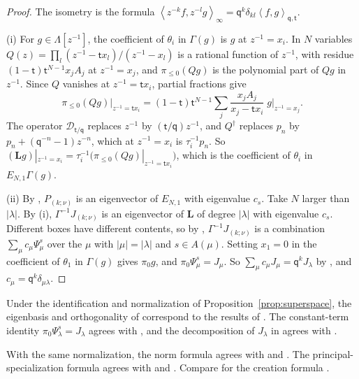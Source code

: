 \documentclass[11pt]{amsart}
\theoremstyle{definition}
\theoremstyle{remark}
\newcommand{\Mq}{\mathsf q}                      %
\newcommand{\Mt}{\mathsf t}                      %
\newcommand{\La}{\Lambda}                        %
\newcommand{\Add}[1]{A(#1)}                      %
\newcommand{\ip}[2]{\left\langle #1,#2\right\rangle}
\newcommand{\ipinf}[2]{\left\langle #1,#2\right\rangle_\infty}   %
\newcommand{\ceig}[1]{c_{#1}}                    %
\newcommand{\LL}{\mathbf L}
\newcommand{\DD}{\mathcal D}
\newcommand{\Twist}[1]{\DD_{#1}}                 %
\newcommand{\piz}{\pi_0}                         %
\newcommand{\pile}{\pi_{\leq0}}                  %
\newcommand{\Qcr}{Q}                             %
\newcommand{\Qan}{Q^\dagger}                     %
\newcommand{\PsiNS}[2]{\Psi_{#1}^{#2}}           %
\newcommand{\Supmap}{\Gamma}                     %
\begin{document}
\begin{proof}
The isometry is the formula \(\ipinf{z^{-k}f}{z^{-l}g}=\Mq^k\delta_{kl}\ip{f}{g}_{\Mq,\Mt}\).

(i) For \(g\in\La[z^{-1}]\), the coefficient of \(\theta_i\) in \(\Supmap(g)\) is \(g\) at \(z^{-1}=x_i\). In
\(N\) variables \(\Qcr(z)=\prod_l(z^{-1}-\Mt x_l)/(z^{-1}-x_l)\) is a rational function of \(z^{-1}\), with
residue \((1-\Mt)\Mt^{N-1}x_jA_j\) at \(z^{-1}=x_j\), and \(\pile(\Qcr g)\) is the polynomial part of
\(\Qcr g\) in \(z^{-1}\). Since \(\Qcr\) vanishes at \(z^{-1}=\Mt x_i\), partial fractions give
\[
 \pile(\Qcr g)\big|_{z^{-1}=\Mt x_i}
 =(1-\Mt)\Mt^{N-1}\sum_j\frac{x_jA_j}{x_j-\Mt x_i}\;g\big|_{z^{-1}=x_j}.
\]
The operator \(\Twist{\Mt/\Mq}\) replaces \(z^{-1}\) by \((\Mt/\Mq)z^{-1}\), and \(\Qan\) replaces \(p_n\)
by \(p_n+(\Mq^{-n}-1)z^{-n}\), which at \(z^{-1}=x_i\) is \(\tau_i^{-1}p_n\). So
\((\LL g)|_{z^{-1}=x_i}=\tau_i^{-1}\bigl(\pile(\Qcr g)|_{z^{-1}=\Mt x_i}\bigr)\), which is the coefficient
of \(\theta_i\) in \(E_{N,1}\Supmap(g)\).

(ii) By \cite[Section~4.5]{Comp}, \(P_{(k;\nu)}\) is an eigenvector of \(E_{N,1}\) with eigenvalue
\(\ceig{s}\). Take \(N\) larger than \(|\lambda|\). By (i), \(\Supmap^{-1}J_{(k;\nu)}\) is an eigenvector of
\(\LL\) of degree \(|\lambda|\) with eigenvalue \(\ceig{s}\). Different boxes have different contents, so
by \cite[Proposition~3.11]{M26}, \(\Supmap^{-1}J_{(k;\nu)}\) is a combination
\(\sum_\mu c_\mu\PsiNS{\mu}{s}\) over the \(\mu\) with
\(|\mu|=|\lambda|\) and \(s\in\Add{\mu}\). Setting \(x_1=0\) in the coefficient of \(\theta_1\) in
\(\Supmap(g)\) gives \(\piz g\), and \(\piz\PsiNS{\mu}{s}=J_\mu\). So \(\sum_\mu c_\mu J_\mu=\Mq^kJ_\lambda\)
by \cite[Proposition~32]{Lapointe}, and \(c_\mu=\Mq^k\delta_{\mu\lambda}\).
\end{proof}

Under the identification and normalization of Proposition~\ref{prop:superspace}, the eigenbasis
and orthogonality of \cite[Propositions~3.11 and~3.13]{M26} correspond to the
results of \cite{BDLM2}. The constant-term identity \(\piz\PsiNS{\lambda}{s}=J_\lambda\)
agrees with \cite[Proposition~32]{Lapointe}, and the decomposition of \(J_\lambda\)
in \cite[Proposition~3.12]{M26} agrees with \cite[Theorem~6]{CL}.

With the same normalization, the norm formula \cite[Lemma~3.16]{M26} agrees with
\cite[Proposition~28]{GL} and \cite[Theorem~19]{CL}.
The principal-specialization formula \cite[Proposition~4.2]{M26}
agrees with \cite[Theorem~15]{GL} and \cite[Proposition~7]{CL}.
Compare \cite[Theorem~4.13]{Goodberry} for the creation formula
\cite[Proposition~4.8]{M26}.
\end{document}
